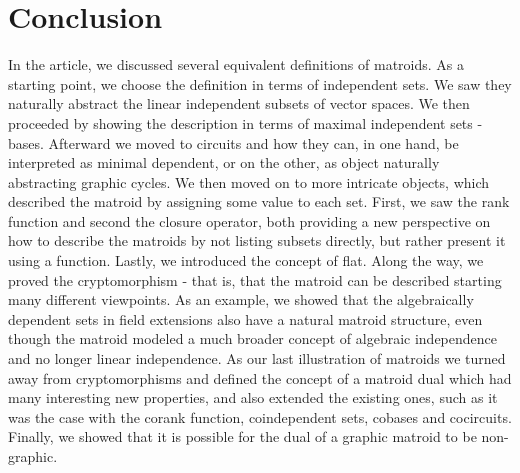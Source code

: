 \newpage
\section{Conclusion}
In the article, we discussed several equivalent definitions of matroids. As a starting point, we choose the definition in terms of independent sets. We saw they naturally abstract the linear independent subsets of vector spaces. We then proceeded by showing the description in terms of maximal independent sets - bases. Afterward we moved to circuits and how they can, in one hand, be interpreted as minimal dependent, or on the other, as object naturally abstracting graphic cycles. We then moved on to more intricate objects, which described the matroid by assigning some value to each set. First, we saw the rank function and second the closure operator, both providing a new perspective on how to describe the matroids by not listing subsets directly, but rather present it using a function. Lastly, we introduced the concept of flat. Along the way, we proved the cryptomorphism - that is, that the matroid can be described starting many different viewpoints. As an example, we showed that the algebraically dependent sets in field extensions also have a natural matroid structure, even though the matroid modeled a much broader concept of algebraic independence and no longer linear independence. As our last illustration of matroids we turned away from cryptomorphisms and defined the concept of a matroid dual which had many interesting new properties, and also extended the existing ones, such as it was the case with the corank function, coindependent sets, cobases and cocircuits. Finally, we showed that it is possible for the dual of a graphic matroid to be non-graphic.
